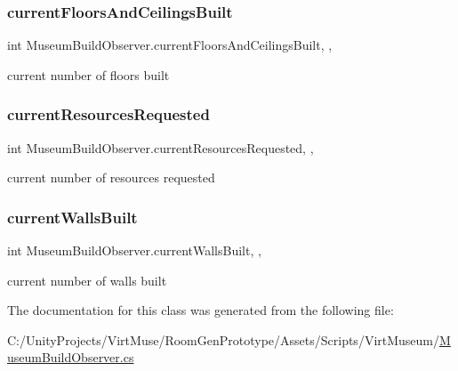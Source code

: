 \subsubsection{\texorpdfstring{current\+Floors\+And\+Ceilings\+Built}{currentFloorsAndCeilingsBuilt}}
{\footnotesize\ttfamily int Museum\+Build\+Observer.\+current\+Floors\+And\+Ceilings\+Built\hspace{0.3cm}{\ttfamily [get]}, {\ttfamily [set]}, {\ttfamily [private]}}



current number of floors built 

\mbox{\label{class_museum_build_observer_a086380dcd30edbd12c4f7c0d4edcbf29}} 
\subsubsection{\texorpdfstring{current\+Resources\+Requested}{currentResourcesRequested}}
{\footnotesize\ttfamily int Museum\+Build\+Observer.\+current\+Resources\+Requested\hspace{0.3cm}{\ttfamily [get]}, {\ttfamily [set]}, {\ttfamily [private]}}



current number of resources requested 

\mbox{\label{class_museum_build_observer_a6f8eb9f119236ca8f3d657c6fe924407}} 
\subsubsection{\texorpdfstring{current\+Walls\+Built}{currentWallsBuilt}}
{\footnotesize\ttfamily int Museum\+Build\+Observer.\+current\+Walls\+Built\hspace{0.3cm}{\ttfamily [get]}, {\ttfamily [set]}, {\ttfamily [private]}}



current number of walls built 



The documentation for this class was generated from the following file\+:\begin{DoxyCompactItemize}
\item 
C\+:/\+Unity\+Projects/\+Virt\+Muse/\+Room\+Gen\+Prototype/\+Assets/\+Scripts/\+Virt\+Museum/\mbox{\hyperlink{_museum_build_observer_8cs}{Museum\+Build\+Observer.\+cs}}\end{DoxyCompactItemize}
